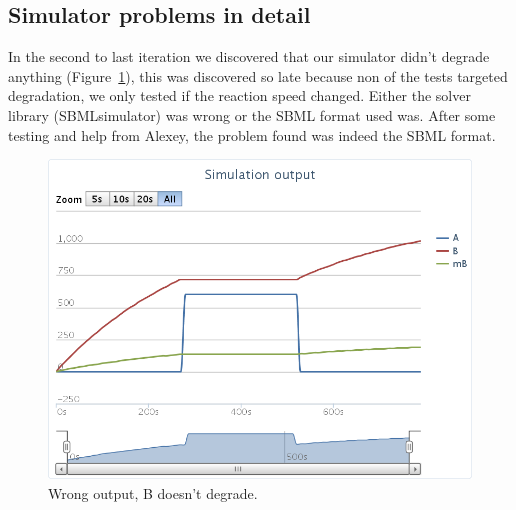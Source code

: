 \subsection{Simulator problems in detail}
\label{simulator-problems}
In the second to last iteration we discovered that our simulator didn't degrade anything (Figure~\ref{fig:wrong}), this was discovered so late because non of the tests targeted degradation, we only tested if the reaction speed changed. Either the solver library (SBMLsimulator) was wrong or the SBML format used was. After some testing and help from Alexey, the problem found was indeed the SBML format.\\

\begin{figure}[h!]
	\centering\includegraphics[scale=0.35]{../../screenshots/2012-05-31-not-output.png}
	\caption{Wrong output, B doesn't degrade.}
	\label{fig:wrong}
\end{figure}

